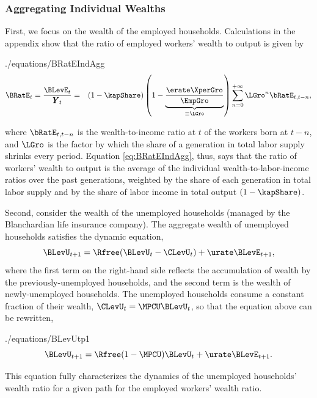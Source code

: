 \documentclass[titlepage]{\econtex}\newcommand{\texname}{cjSOE}
\renewcommand{\GDPLev}{\ensuremath{\pmb{Y}}}
\begin{document}
\subsubsection{Aggregating Individual Wealths}

First, we focus on the wealth of the employed households. Calculations
in the appendix show that the ratio of employed workers' wealth to
output is given by
\begin{verbatimwrite}{./equations/BRatEIndAgg}
\begin{eqnarray}
\BRatE_{t} = \frac{\BLevE_t}{\GDPLev_t} & = & (1-\kapShare) \left(1-\underbrace{\frac{\erate\XperGro}{\EmpGro}}_{\equiv \LGro}\right) \sum_{n=0}^{+\infty}\LGro^{n} \bRatE_{t,t-n}, \label{eq:LGro} \label{eq:BRatEIndAgg}
\end{eqnarray}
\end{verbatimwrite}

where $\bRatE_{t,t-n}$ is the wealth-to-income ratio at $t$ of the workers born at $t-n$, and $\LGro$ is the factor by which the share of a generation in total labor supply shrinks every period. Equation \eqref{eq:BRatEIndAgg}, thus, says that the ratio of workers' wealth to output is the average of the individual wealth-to-labor-income ratios over the past generations, weighted by the share of each generation in total labor supply and by the share of labor income in total output $(1-\kapShare)$.

Second, consider the wealth of the unemployed households (managed by the Blanchardian life insurance company). The aggregate wealth of unemployed households satisfies the dynamic equation,
\begin{equation*}
\BLevU_{t+1}= \Rfree (\BLevU_{t} -\CLevU_t)+ \urate \BLevE_{t+1},
\end{equation*}
where the first term on the right-hand side reflects the accumulation of wealth by the previously-unemployed households, and the second term is the wealth of newly-unemployed households. The unemployed households consume a constant fraction of their wealth, $\CLevU_t= \MPCU \BLevU_{t}$, so that the equation above can be rewritten,
\begin{verbatimwrite}{./equations/BLevUtp1}
\begin{equation}
\BLevU_{t+1}= \Rfree (1-\MPCU) \BLevU_{t}+ \urate \BLevE_{t+1}.
\label{eq:BLevUtp1}
\end{equation}
\end{verbatimwrite}

This equation fully characterizes the dynamics of the unemployed households' wealth ratio for a given path for the employed workers' wealth ratio.
\end{document}
